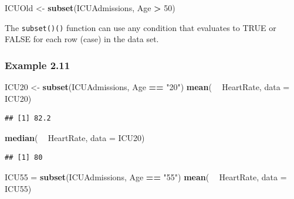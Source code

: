 \documentclass[]{book}
\newenvironment{Shaded}{\begin{snugshade}}{\end{snugshade}}
\newcommand{\DataTypeTok}[1]{\textcolor[rgb]{0.13,0.29,0.53}{#1}}
\newcommand{\DecValTok}[1]{\textcolor[rgb]{0.00,0.00,0.81}{#1}}
\newcommand{\KeywordTok}[1]{\textcolor[rgb]{0.13,0.29,0.53}{\textbf{#1}}}
\newcommand{\NormalTok}[1]{#1}
\newcommand{\OperatorTok}[1]{\textcolor[rgb]{0.81,0.36,0.00}{\textbf{#1}}}
\newcommand{\StringTok}[1]{\textcolor[rgb]{0.31,0.60,0.02}{#1}}
\begin{document}
\begin{Shaded}
\begin{Highlighting}[]
\NormalTok{ICUOld <-}\StringTok{ }\KeywordTok{subset}\NormalTok{(ICUAdmissions, Age }\OperatorTok{>}\StringTok{ }\DecValTok{50}\NormalTok{) }
\end{Highlighting}
\end{Shaded}

The \texttt{subset()()} function can use any condition that evaluates to TRUE or FALSE for each row (case) in the data set.

\hypertarget{example-2.11}{%
\subsubsection{Example 2.11}\label{example-2.11}}

\begin{Shaded}
\begin{Highlighting}[]
\NormalTok{ICU20 <-}\StringTok{ }\KeywordTok{subset}\NormalTok{(ICUAdmissions, Age }\OperatorTok{==}\StringTok{ "20"}\NormalTok{)}
\KeywordTok{mean}\NormalTok{( }\OperatorTok{~}\StringTok{ }\NormalTok{HeartRate, }\DataTypeTok{data =}\NormalTok{ ICU20)}
\end{Highlighting}
\end{Shaded}

\begin{verbatim}
## [1] 82.2
\end{verbatim}

\begin{Shaded}
\begin{Highlighting}[]
\KeywordTok{median}\NormalTok{( }\OperatorTok{~}\StringTok{ }\NormalTok{HeartRate, }\DataTypeTok{data =}\NormalTok{ ICU20)}
\end{Highlighting}
\end{Shaded}

\begin{verbatim}
## [1] 80
\end{verbatim}

\begin{Shaded}
\begin{Highlighting}[]
\NormalTok{ICU55 =}\StringTok{ }\KeywordTok{subset}\NormalTok{(ICUAdmissions, Age }\OperatorTok{==}\StringTok{ "55"}\NormalTok{)}
\KeywordTok{mean}\NormalTok{( }\OperatorTok{~}\StringTok{ }\NormalTok{HeartRate, }\DataTypeTok{data =}\NormalTok{ ICU55)}
\end{Highlighting}
\end{Shaded}
\end{document}
